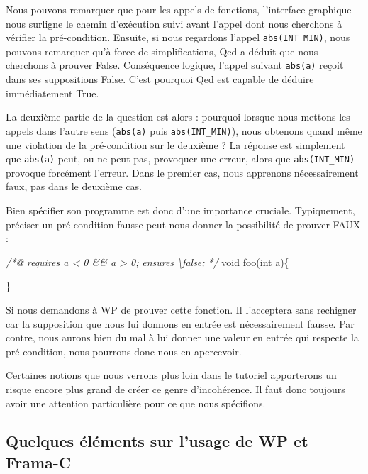 \documentclass[12pt,francais,]{scrbook}
\newenvironment{Shaded}{}{}
\newcommand{\DataTypeTok}[1]{\textcolor[rgb]{0.56,0.13,0.00}{{#1}}}
\newcommand{\CommentTok}[1]{\textcolor[rgb]{0.38,0.63,0.69}{\textit{{#1}}}}
\newcommand{\NormalTok}[1]{{#1}}
\begin{document}
Nous pouvons remarquer que pour les appels de fonctions, l'interface
graphique nous surligne le chemin d'exécution suivi avant l'appel dont
nous cherchons à vérifier la pré-condition. Ensuite, si nous regardons
l'appel \texttt{abs(INT\_MIN)}, nous pouvons remarquer qu'à force de
simplifications, Qed a déduit que nous cherchons à prouver \og{}False\fg{}.
Conséquence logique, l'appel suivant \texttt{abs(a)} reçoit dans ses
suppositions \og{}False\fg{}. C'est pourquoi Qed est capable de déduire
immédiatement \og{}True\fg{}.

La deuxième partie de la question est alors : pourquoi lorsque nous
mettons les appels dans l'autre sens (\texttt{abs(a)} puis
\texttt{abs(INT\_MIN)}), nous obtenons quand même une violation de la
pré-condition sur le deuxième ? La réponse est simplement que
\texttt{abs(a)} peut, ou ne peut pas, provoquer une erreur, alors que
\texttt{abs(INT\_MIN)} provoque forcément l'erreur. Dans le premier cas,
nous apprenons nécessairement \og{}faux\fg{}, pas dans le deuxième cas.

Bien spécifier son programme est donc d'une importance cruciale.
Typiquement, préciser un pré-condition fausse peut nous donner la
possibilité de prouver FAUX :

\begin{footnotesize}\begin{Shaded}
\begin{Highlighting}[]
\CommentTok{/*@}
\CommentTok{  requires a < 0 && a > 0;}
\CommentTok{  ensures  \textbackslash{}false;}
\CommentTok{*/}
\DataTypeTok{void} \NormalTok{foo(}\DataTypeTok{int} \NormalTok{a)\{}

\NormalTok{\}}
\end{Highlighting}
\end{Shaded}\end{footnotesize}

Si nous demandons à WP de prouver cette fonction. Il l'acceptera sans
rechigner car la supposition que nous lui donnons en entrée est
nécessairement fausse. Par contre, nous aurons bien du mal à lui donner
une valeur en entrée qui respecte la pré-condition, nous pourrons donc
nous en apercevoir.

Certaines notions que nous verrons plus loin dans le tutoriel
apporterons un risque encore plus grand de créer ce genre d'incohérence.
Il faut donc toujours avoir une attention particulière pour ce que nous
spécifions.

\subsection{Quelques éléments sur l'usage de WP et
Frama-C}\label{quelques-uxe9luxe9ments-sur-lusage-de-wp-et-frama-c}
\end{document}

